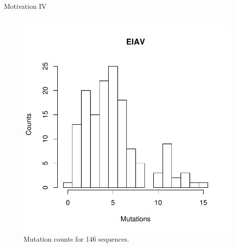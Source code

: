 \documentclass{beamer}
\begin{document}
\begin{frame}{Motivation IV}
\begin{columns}
\begin{column}{0.4\textwidth}
  \begin{figure}
  \includegraphics[width=\textwidth]{./graph/eiav_ht}
  \\
  {\tiny Mutation counts for 146 sequences.}
  \end{figure}
\end{column}

\end{columns}

\end{frame}

\end{document}
